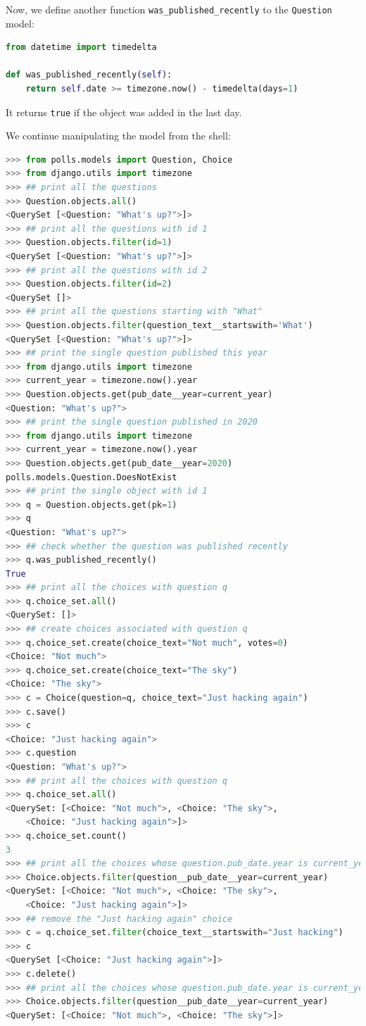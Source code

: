 \documentclass[a4paper, openany]{memoir}
\begin{document}
    \noindent Now, we define another function \texttt{was\_published\_recently} to the \texttt{Question} model:
\begin{lstlisting}[language=python]
from datetime import timedelta

def was_published_recently(self):
    return self.date >= timezone.now() - timedelta(days=1)
\end{lstlisting}
    It returns \texttt{true} if the object was added in the last day. 

    \noindent We continue manipulating the model from the shell:
\begin{lstlisting}[language=python]
>>> from polls.models import Question, Choice
>>> from django.utils import timezone
>>> ## print all the questions
>>> Question.objects.all()
<QuerySet [<Question: "What's up?">]>
>>> ## print all the questions with id 1
>>> Question.objects.filter(id=1)
<QuerySet [<Question: "What's up?">]>
>>> ## print all the questions with id 2
>>> Question.objects.filter(id=2)
<QuerySet []>
>>> ## print all the questions starting with "What"
>>> Question.objects.filter(question_text__startswith='What')
<QuerySet [<Question: "What's up?">]>
>>> ## print the single question published this year
>>> from django.utils import timezone
>>> current_year = timezone.now().year
>>> Question.objects.get(pub_date__year=current_year)
<Question: "What's up?">
>>> ## print the single question published in 2020
>>> from django.utils import timezone
>>> current_year = timezone.now().year
>>> Question.objects.get(pub_date__year=2020)
polls.models.Question.DoesNotExist
>>> ## print the single object with id 1
>>> q = Question.objects.get(pk=1)
>>> q
<Question: "What's up?">
>>> ## check whether the question was published recently
>>> q.was_published_recently()
True
>>> ## print all the choices with question q
>>> q.choice_set.all()
<QuerySet: []>
>>> ## create choices associated with question q
>>> q.choice_set.create(choice_text="Not much", votes=0)
<Choice: "Not much">
>>> q.choice_set.create(choice_text="The sky")
<Choice: "The sky">
>>> c = Choice(question=q, choice_text="Just hacking again")
>>> c.save()
>>> c
<Choice: "Just hacking again">
>>> c.question
<Question: "What's up?">
>>> ## print all the choices with question q
>>> q.choice_set.all()
<QuerySet: [<Choice: "Not much">, <Choice: "The sky">, 
    <Choice: "Just hacking again">]>
>>> q.choice_set.count()
3
>>> ## print all the choices whose question.pub_date.year is current_year
>>> Choice.objects.filter(question__pub_date__year=current_year)
<QuerySet: [<Choice: "Not much">, <Choice: "The sky">, 
    <Choice: "Just hacking again">]>
>>> ## remove the "Just hacking again" choice
>>> c = q.choice_set.filter(choice_text__startswith="Just hacking")
>>> c
<QuerySet [<Choice: "Just hacking again">]>
>>> c.delete()
>>> ## print all the choices whose question.pub_date.year is current_year
>>> Choice.objects.filter(question__pub_date__year=current_year)
<QuerySet: [<Choice: "Not much">, <Choice: "The sky">]>
\end{lstlisting}
\end{document}
